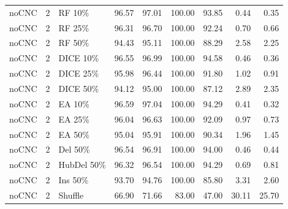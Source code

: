 {\begin{longtable}{rllrrrrrr}
noCNC & 2 & RF 10\% & 96.57 & 97.01 & 100.00 & 93.85 & 0.44 & 0.35 \\
noCNC & 2 & RF 25\% & 96.31 & 96.70 & 100.00 & 92.24 & 0.70 & 0.66 \\
noCNC & 2 & RF 50\% & 94.43 & 95.11 & 100.00 & 88.29 & 2.58 & 2.25 \\
noCNC & 2 & DICE 10\% & 96.55 & 96.99 & 100.00 & 94.58 & 0.46 & 0.36 \\
noCNC & 2 & DICE 25\% & 95.98 & 96.44 & 100.00 & 91.80 & 1.02 & 0.91 \\
noCNC & 2 & DICE 50\% & 94.12 & 95.00 & 100.00 & 87.12 & 2.89 & 2.35 \\
noCNC & 2 & EA 10\% & 96.59 & 97.04 & 100.00 & 94.29 & 0.41 & 0.32 \\
noCNC & 2 & EA 25\% & 96.04 & 96.63 & 100.00 & 92.09 & 0.97 & 0.73 \\
noCNC & 2 & EA 50\% & 95.04 & 95.91 & 100.00 & 90.34 & 1.96 & 1.45 \\
noCNC & 2 & Del 50\% & 96.54 & 96.91 & 100.00 & 94.00 & 0.46 & 0.44 \\
noCNC & 2 & HubDel 50\% & 96.32 & 96.54 & 100.00 & 94.29 & 0.69 & 0.81 \\
noCNC & 2 & Ins 50\% & 93.70 & 94.76 & 100.00 & 85.80 & 3.31 & 2.60 \\
noCNC & 2 & Shuffle & 66.90 & 71.66 & 83.00 & 47.00 & 30.11 & 25.70 \\
\end{longtable}
}

